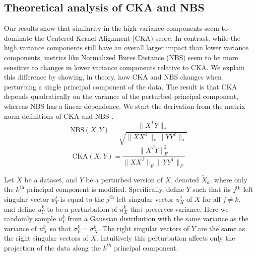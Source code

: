 \documentclass{article} %
\begin{document}











\subsection{Theoretical analysis of CKA and NBS} \label{appendix:cka_nbs_theory}
Our results show that similarity in the high variance components seem to dominate the Centered Kernel Alignment (CKA) score. In contrast, while the high variance components still have an overall larger impact than lower variance components, metrics like Normalized Bures Distance (NBS) seem to be more sensitive to changes in lower variance components relative to CKA. We explain this difference by showing, in theory, how CKA and NBS changes when perturbing a single principal component of the data. The result is that CKA depends quadratically on the variance of the perturbed principal component, whereas NBS has a linear dependence. We start the derivation from the matrix norm definitions of CKA and NBS \citep{harvey2023duality}.
$$\text{NBS}(X, Y) = \dfrac{\|X^T Y\|_*}{\sqrt{\|X X^T\|_* \|Y Y^T\|_*}}$$
$$\text{CKA}(X, Y) = \dfrac{\| X^T Y \|^2_F}{\| X X^T \|_F \| Y Y^T \|_F}$$


Let $X$ be a dataset, and $Y$ be a perturbed version of $X$, denoted $\tilde{X}_k$, where only the $k^{\text{th}}$ principal component is modified. Specifically, define $Y$ such that its $j^{\text{th}}$ left singular vector $u_Y^j$ is equal to the $j^{\text{th}}$ left singular vector $u_X^j$ of $X$ for all $j \neq k$, and define $u_Y^k$ to be a perturbation of $u_X^k$ that preserves variance. Here we randomly sample $u_Y^k$ from a Gaussian distribution with the same variance as the variance of $u_X^k$ so that $\sigma_Y^k = \sigma_X^k$. The right singular vectors of $Y$ are the same as the right singular vectors of $X$. Intuitively this perturbation affects only the projection of the data along the $k^{th}$ principal component.
\end{document}
